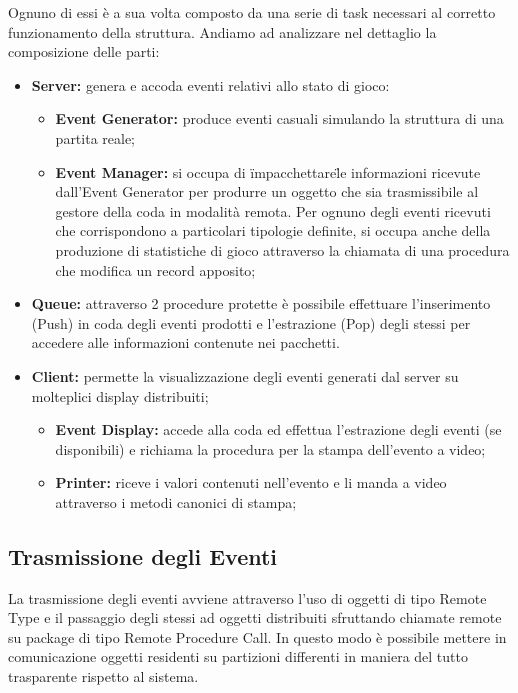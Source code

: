 \documentclass[aps,letterpaper,10pt]{article}
\begin{document}
Ognuno di essi \`e a sua volta composto da una serie di task necessari al corretto funzionamento della struttura. Andiamo ad analizzare nel dettaglio la composizione delle parti:

\begin{itemize}
	\item \textbf{Server:} genera e accoda eventi relativi allo stato di gioco:
		\begin{itemize}
			\item \textbf{Event Generator:} produce eventi casuali simulando la struttura di una partita reale;
			\item \textbf{Event Manager:} si occupa di \"impacchettare\" le informazioni ricevute dall'Event Generator per produrre un oggetto che sia trasmissibile al gestore della coda in modalit\`a remota. Per ognuno degli eventi ricevuti che corrispondono a particolari tipologie definite, si occupa anche della produzione di statistiche di gioco attraverso la chiamata di una procedura che modifica un record apposito;
		\end{itemize}
	\item \textbf{Queue:} attraverso 2 procedure protette \`e possibile effettuare l'inserimento (Push) in coda degli eventi prodotti e l'estrazione (Pop) degli stessi per accedere alle informazioni contenute nei pacchetti.
	\item \textbf{Client:} permette la visualizzazione degli eventi generati dal server su molteplici display distribuiti;
		\begin{itemize}
		\item \textbf{Event Display:} accede alla coda ed effettua l'estrazione degli eventi (se disponibili) e richiama la procedura per la stampa dell'evento a video;
		\item \textbf{Printer:} riceve i valori contenuti nell'evento e li manda a video attraverso i metodi canonici di stampa;
		\end{itemize}
\end{itemize}

\subsection{Trasmissione degli Eventi}

La trasmissione degli eventi avviene attraverso l'uso di oggetti di tipo Remote Type e il passaggio degli stessi ad oggetti distribuiti sfruttando chiamate remote su package di tipo Remote Procedure Call. In questo modo \`e possibile mettere in comunicazione oggetti residenti su partizioni differenti in maniera del tutto trasparente rispetto al sistema. \vspace{3mm}
\end{document}
